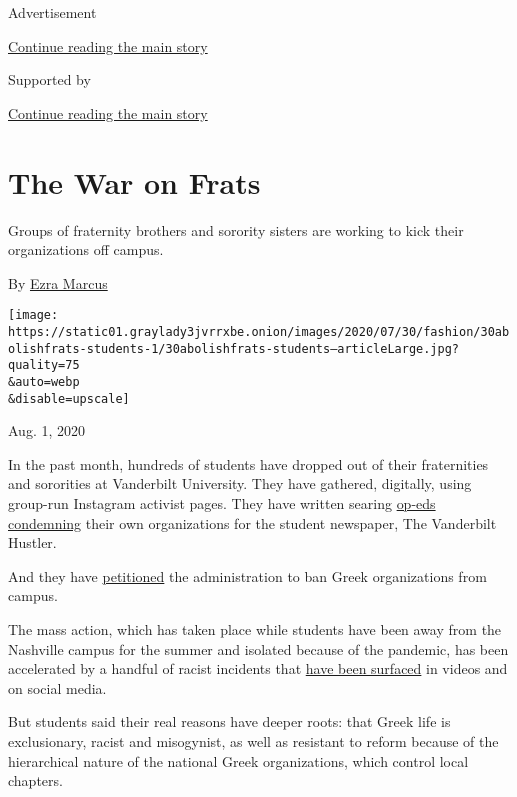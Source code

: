 Advertisement

\protect\hyperlink{after-top}{Continue reading the main story}

Supported by

\protect\hyperlink{after-sponsor}{Continue reading the main story}

\hypertarget{the-war-on-frats}{%
\section{The War on Frats}\label{the-war-on-frats}}

Groups of fraternity brothers and sorority sisters are working to kick
their organizations off campus.

By \href{https://www.nytimes3xbfgragh.onion/by/ezra-marcus}{Ezra Marcus}

\texttt{[image: https://static01.graylady3jvrrxbe.onion/images/2020/07/30/fashion/30abolishfrats-students-1/30abolishfrats-students--articleLarge.jpg?quality=75\\\&auto=webp\\\&disable=upscale]}

Aug. 1, 2020

In the past month, hundreds of students have dropped out of their
fraternities and sororities at Vanderbilt University. They have
gathered, digitally, using group-run Instagram activist pages. They have
written searing
\href{https://vanderbilthustler.com/33211/featured/schulman-drop/}{op-eds}
\href{https://vanderbilthustler.com/33241/featured/guest-editorial-a-message-from-the-former-brothers-of-delta-tau-delta/}{condemning}
their own organizations for the student newspaper, The Vanderbilt
Hustler.

And they have
\href{https://www.change.org/p/vanderbilt-university-abolish-ifc-and-panhellenic-organizations-at-vanderbilt-university?utm_content=cl_sharecopy_23388057_en-US\%3A6\&recruiter=316950555\&recruited_by_id=962f0bd0-1382-11e5-9061-9518c3aa4d04\&utm_source=share_petitio}{petitioned}
the administration to ban Greek organizations from campus.

The mass action, which has taken place while students have been away
from the Nashville campus for the summer and isolated because of the
pandemic, has been accelerated by a handful of racist incidents that
\href{https://news.vanderbilt.edu/2020/07/07/vanderbilt-university-statement-on-greek-life/}{have
been surfaced} in videos and on social media.

But students said their real reasons have deeper roots: that Greek life
is exclusionary, racist and misogynist, as well as resistant to reform
because of the hierarchical nature of the national Greek organizations,
which control local chapters.

